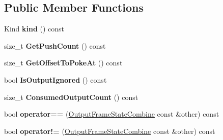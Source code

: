 \subsection*{Public Member Functions}
\begin{DoxyCompactItemize}
\item 
Kind {\bfseries kind} () const \hypertarget{classv8_1_1internal_1_1compiler_1_1_output_frame_state_combine_acd1a43acac1df9d850309df6b6cf63ba}{}\label{classv8_1_1internal_1_1compiler_1_1_output_frame_state_combine_acd1a43acac1df9d850309df6b6cf63ba}

\item 
size\+\_\+t {\bfseries Get\+Push\+Count} () const \hypertarget{classv8_1_1internal_1_1compiler_1_1_output_frame_state_combine_a9dbadc402d02168285349cb94e6e1515}{}\label{classv8_1_1internal_1_1compiler_1_1_output_frame_state_combine_a9dbadc402d02168285349cb94e6e1515}

\item 
size\+\_\+t {\bfseries Get\+Offset\+To\+Poke\+At} () const \hypertarget{classv8_1_1internal_1_1compiler_1_1_output_frame_state_combine_a9de2b94c272a796b693a94c4e8f0f7b1}{}\label{classv8_1_1internal_1_1compiler_1_1_output_frame_state_combine_a9de2b94c272a796b693a94c4e8f0f7b1}

\item 
bool {\bfseries Is\+Output\+Ignored} () const \hypertarget{classv8_1_1internal_1_1compiler_1_1_output_frame_state_combine_aabb5989f56449f6c14552719ce13db92}{}\label{classv8_1_1internal_1_1compiler_1_1_output_frame_state_combine_aabb5989f56449f6c14552719ce13db92}

\item 
size\+\_\+t {\bfseries Consumed\+Output\+Count} () const \hypertarget{classv8_1_1internal_1_1compiler_1_1_output_frame_state_combine_af95b053f1a73c15f7f7104c6174f55c0}{}\label{classv8_1_1internal_1_1compiler_1_1_output_frame_state_combine_af95b053f1a73c15f7f7104c6174f55c0}

\item 
bool {\bfseries operator==} (\hyperlink{classv8_1_1internal_1_1compiler_1_1_output_frame_state_combine}{Output\+Frame\+State\+Combine} const \&other) const \hypertarget{classv8_1_1internal_1_1compiler_1_1_output_frame_state_combine_a7b3fbc11bf3c55a1d657fde21202c5ec}{}\label{classv8_1_1internal_1_1compiler_1_1_output_frame_state_combine_a7b3fbc11bf3c55a1d657fde21202c5ec}

\item 
bool {\bfseries operator!=} (\hyperlink{classv8_1_1internal_1_1compiler_1_1_output_frame_state_combine}{Output\+Frame\+State\+Combine} const \&other) const \hypertarget{classv8_1_1internal_1_1compiler_1_1_output_frame_state_combine_a34ae7519cce6726dd6bfd6094c980fba}{}\label{classv8_1_1internal_1_1compiler_1_1_output_frame_state_combine_a34ae7519cce6726dd6bfd6094c980fba}

\end{DoxyCompactItemize}
